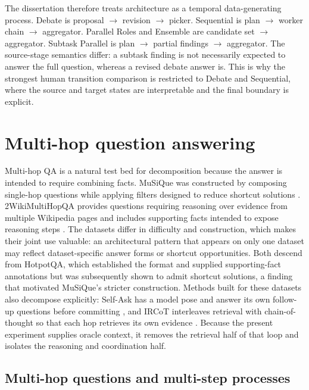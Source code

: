 The dissertation therefore treats architecture as a temporal data-generating process. Debate is proposal $\rightarrow$ revision $\rightarrow$ picker. Sequential is plan $\rightarrow$ worker chain $\rightarrow$ aggregator. Parallel Roles and Ensemble are candidate set $\rightarrow$ aggregator. Subtask Parallel is plan $\rightarrow$ partial findings $\rightarrow$ aggregator. The source-stage semantics differ: a subtask finding is not necessarily expected to answer the full question, whereas a revised debate answer is. This is why the strongest human transition comparison is restricted to Debate and Sequential, where the source and target states are interpretable and the final boundary is explicit.

\section{Multi-hop question answering}

Multi-hop QA is a natural test bed for decomposition because the answer is intended to require combining facts. MuSiQue was constructed by composing single-hop questions while applying filters designed to reduce shortcut solutions \citep{trivedi2022musique}. 2WikiMultiHopQA provides questions requiring reasoning over evidence from multiple Wikipedia pages and includes supporting facts intended to expose reasoning steps \citep{ho2020twowiki}. The datasets differ in difficulty and construction, which makes their joint use valuable: an architectural pattern that appears on only one dataset may reflect dataset-specific answer forms or shortcut opportunities. Both descend from HotpotQA, which established the format and supplied supporting-fact annotations \citep{yang2018hotpotqa} but was subsequently shown to admit shortcut solutions, a finding that motivated MuSiQue's stricter construction. Methods built for these datasets also decompose explicitly: Self-Ask has a model pose and answer its own follow-up questions before committing \citep{press2023selfask}, and IRCoT interleaves retrieval with chain-of-thought so that each hop retrieves its own evidence \citep{trivedi2023ircot}. Because the present experiment supplies oracle context, it removes the retrieval half of that loop and isolates the reasoning and coordination half.

\subsection{Multi-hop questions and multi-step processes}
\label{sec:hop-vs-step}

